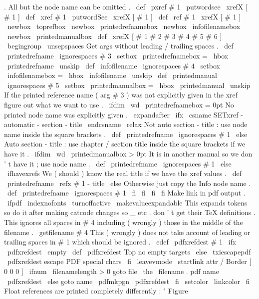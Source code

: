 {{{{.
All
but
the
node
name
can
be
omitted
.
%
\
def
\
pxref
#
1
{
\
putwordsee
{
}
\
xrefX
[
#
1
]
}
\
def
\
xref
#
1
{
\
putwordSee
{
}
\
xrefX
[
#
1
]
}
\
def
\
ref
#
1
{
\
xrefX
[
#
1
]
}
%
\
newbox
\
toprefbox
\
newbox
\
printedrefnamebox
\
newbox
\
infofilenamebox
\
newbox
\
printedmanualbox
%
\
def
\
xrefX
[
#
1
#
2
#
3
#
4
#
5
#
6
]
{
\
begingroup
\
unsepspaces
%
%
Get
args
without
leading
/
trailing
spaces
.
\
def
\
printedrefname
{
\
ignorespaces
#
3
}
%
\
setbox
\
printedrefnamebox
=
\
hbox
{
\
printedrefname
\
unskip
}
%
%
\
def
\
infofilename
{
\
ignorespaces
#
4
}
%
\
setbox
\
infofilenamebox
=
\
hbox
{
\
infofilename
\
unskip
}
%
%
\
def
\
printedmanual
{
\
ignorespaces
#
5
}
%
\
setbox
\
printedmanualbox
=
\
hbox
{
\
printedmanual
\
unskip
}
%
%
%
If
the
printed
reference
name
(
arg
#
3
)
was
not
explicitly
given
in
%
the
xref
figure
out
what
we
want
to
use
.
\
ifdim
\
wd
\
printedrefnamebox
=
0pt
%
No
printed
node
name
was
explicitly
given
.
\
expandafter
\
ifx
\
csname
SETxref
-
automatic
-
section
-
title
\
endcsname
\
relax
%
Not
auto
section
-
title
:
use
node
name
inside
the
square
brackets
.
\
def
\
printedrefname
{
\
ignorespaces
#
1
}
%
\
else
%
Auto
section
-
title
:
use
chapter
/
section
title
inside
%
the
square
brackets
if
we
have
it
.
\
ifdim
\
wd
\
printedmanualbox
>
0pt
%
It
is
in
another
manual
so
we
don
'
t
have
it
;
use
node
name
.
\
def
\
printedrefname
{
\
ignorespaces
#
1
}
%
\
else
\
ifhavexrefs
%
We
(
should
)
know
the
real
title
if
we
have
the
xref
values
.
\
def
\
printedrefname
{
\
refx
{
#
1
-
title
}
{
}
}
%
\
else
%
Otherwise
just
copy
the
Info
node
name
.
\
def
\
printedrefname
{
\
ignorespaces
#
1
}
%
\
fi
%
\
fi
\
fi
\
fi
%
%
Make
link
in
pdf
output
.
\
ifpdf
{
\
indexnofonts
\
turnoffactive
\
makevalueexpandable
%
This
expands
tokens
so
do
it
after
making
catcode
changes
so
_
%
etc
.
don
'
t
get
their
TeX
definitions
.
This
ignores
all
spaces
in
%
#
4
including
(
wrongly
)
those
in
the
middle
of
the
filename
.
\
getfilename
{
#
4
}
%
%
%
This
(
wrongly
)
does
not
take
account
of
leading
or
trailing
%
spaces
in
#
1
which
should
be
ignored
.
\
edef
\
pdfxrefdest
{
#
1
}
%
\
ifx
\
pdfxrefdest
\
empty
\
def
\
pdfxrefdest
{
Top
}
%
no
empty
targets
\
else
\
txiescapepdf
\
pdfxrefdest
%
escape
PDF
special
chars
\
fi
%
\
leavevmode
\
startlink
attr
{
/
Border
[
0
0
0
]
}
%
\
ifnum
\
filenamelength
>
0
goto
file
{
\
the
\
filename
.
pdf
}
name
{
\
pdfxrefdest
}
%
\
else
goto
name
{
\
pdfmkpgn
{
\
pdfxrefdest
}
}
%
\
fi
}
%
\
setcolor
{
\
linkcolor
}
%
\
fi
%
%
Float
references
are
printed
completely
differently
:
"
Figure
}}}}}
